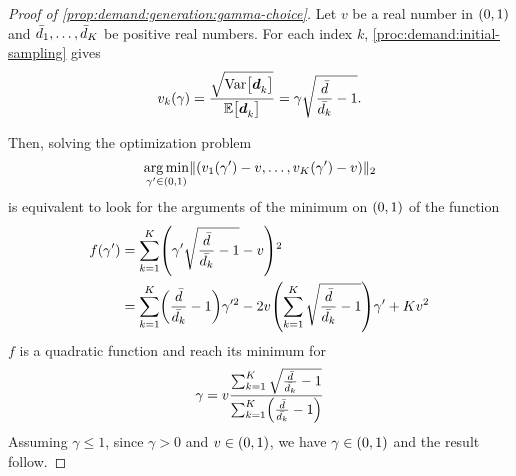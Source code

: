 \medskip


\begin{proof}[Proof of \cref{prop:demand:generation:gamma-choice}]
Let $v$ be a real number in $\bracket{0,1}$ and $\bar{d}_1,\ldots,\bar{d}_K$ be positive real numbers.
For each index $k$, \cref{proc:demand:initial-sampling} gives
\begin{equation}
  v_k\bracket{\gamma}
  = \frac{\sqrt{\vari\sqbracket{\va\demand_k}}}{\espe\sqbracket{\va\demand_k}}
  = \gamma\sqrt{\frac{\bar{\demand}}{\bar{\demand_k}}-1}.
\end{equation}

Then, solving the optimization problem
\begin{equation}\label{eq:dirichlet:optimization}
  \argmin_{\gamma'\in\bracket{0,1}} \norm{\bracket{v_1(\gamma')-v,\ldots,v_K(\gamma')-v}}_2
\end{equation}
is equivalent to look for the arguments of the minimum on $\bracket{0,1}$ of the function
\begin{subequations}
\begin{align}
  f\bracket{\gamma'}
  &= \sum_{k=1}^K \bracket{\gamma'\sqrt{\frac{\bar{\demand}}{\bar{\demand_k}}-1}-v}^2
  \\
  &= \sum_{k=1}^K\bracket{\frac{\bar{\demand}}{\bar{\demand_k}}-1}\gamma'^2
  - 2v\bracket{\sum_{k=1}^K\sqrt{\frac{\bar{\demand}}{\bar{\demand_k}}-1}}\gamma'
  + K v^2
\end{align}
\end{subequations}
$f$ is a quadratic function and reach its minimum for
\begin{equation}
  \gamma
  =
  v\frac
  {\sum_{k=1}^K\sqrt{\frac{\bar{\demand}}{\bar{\demand_k}}-1}}
  {\sum_{k=1}^K\bracket{\frac{\bar{\demand}}{\bar{\demand_k}}-1}}
\end{equation}
Assuming $\gamma\le 1$, since $\gamma>0$ and $v\in\bracket{0,1}$, we have $\gamma\in\bracket{0,1}$ and the result follow.

\medskip


\end{proof}
